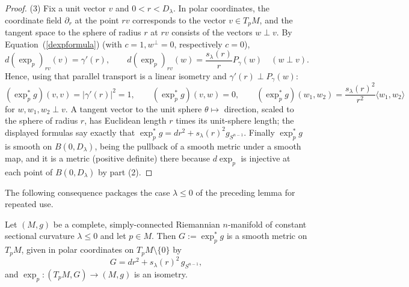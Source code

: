 \begin{proof}
(3) Fix a unit vector $v$ and $0<r<D_\lambda$. In polar coordinates,
the coordinate field $\partial_r$ at the point $rv$ corresponds to
the vector $v\in T_pM$, and the tangent space to the sphere of
radius $r$ at $rv$ consists of the vectors $w\perp v$. By
Equation~(\ref{dexpformula}) (with $c=1,w^\perp=0$, respectively
$c=0$),
$$d(\exp_p)_{rv}(v)=\gamma'(r),\qquad
d(\exp_p)_{rv}(w)=\frac{s_\lambda(r)}{r}P_\gamma(w)\quad (w\perp
v).$$
Hence, using that parallel transport is a linear isometry and
$\gamma'(r)\perp P_\gamma(w)$:
$$(\exp_p^*g)(v,v)=|\gamma'(r)|^2=1,\qquad
(\exp_p^*g)(v,w)=0,\qquad
(\exp_p^*g)(w_1,w_2)
=\frac{s_\lambda(r)^2}{r^2}\langle w_1,w_2\rangle$$
for $w,w_1,w_2\perp v$. A tangent vector to the unit sphere
$\theta\mapsto$ direction, scaled to the sphere of radius $r$, has
Euclidean length $r$ times its unit-sphere length; the displayed
formulas say exactly that
$\exp_p^*g=dr^2+s_\lambda(r)^2g_{S^{n-1}}$. Finally $\exp_p^*g$ is
smooth on $B(0,D_\lambda)$, being the pullback of a smooth metric
under a smooth map, and it is a metric (positive definite) there
because $d\exp_p$ is injective at each point of $B(0,D_\lambda)$ by
part (2).
\end{proof}

The following consequence packages the case $\lambda\le0$ of the
preceding lemma for repeated use.

\begin{lemma}
\label{lem:model-polar-isometry}
Let $(M,g)$ be a complete, simply-connected Riemannian $n$-manifold
of constant sectional curvature $\lambda\le0$ and let $p\in M$.
Then $G:=\exp_p^*g$ is a smooth metric on $T_pM$, given in
polar coordinates on $T_pM\setminus\{0\}$ by
$$G=dr^2+s_\lambda(r)^2\,g_{S^{n-1}},$$
and $\exp_p\colon(T_pM,G)\to(M,g)$ is an isometry.
\end{lemma}

